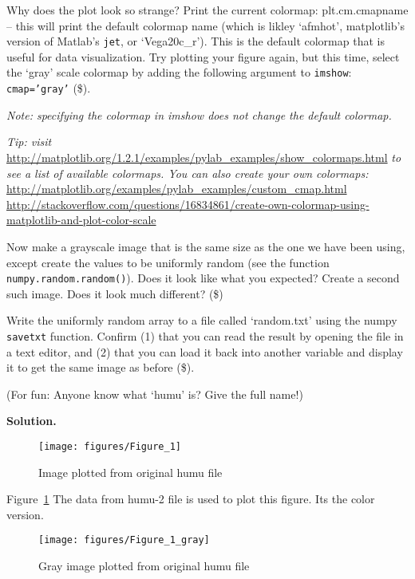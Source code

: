 \documentclass[10pt]{article}
\begin{document}
\begin{enumerate}
Why does the plot look so strange?  Print the current colormap: {plt.cm.cmapname} -- this will print the default colormap name (which is likley `afmhot', matplotlib's version of Matlab's {\tt jet}, or `Vega20c\_r').  This is the default colormap that is useful for data visualization.  Try plotting your figure again, but this time, select the `gray' scale colormap by adding the following argument to {\tt imshow}: {\tt cmap='gray'} (\$).

{\em Note: specifying the colormap in imshow does not change the default colormap.}

{\em Tip: visit} \url{http://matplotlib.org/1.2.1/examples/pylab_examples/show_colormaps.html} {\em to see a list of available colormaps.  You can also create your own colormaps:}\\
\url{http://matplotlib.org/examples/pylab_examples/custom_cmap.html}\\
\url{http://stackoverflow.com/questions/16834861/create-own-colormap-using-matplotlib-and-plot-color-scale}

Now make a grayscale image that is the same size as the one we have been using, except create the values to be uniformly random (see the function {\tt numpy.random.random()}).  Does it look like what you expected?  Create a second such image.  Does it look much different? (\$)

Write the uniformly random array to a file called `random.txt' using the numpy {\tt savetxt} function.  Confirm (1) that you can read the result by opening the file in a text editor, and (2) that you can load it back into another variable and display it to get the same image as before (\$).

(For fun: Anyone know what `humu' is?  Give the full name!)

{\bf Solution.} 
\begin{figure}[htb]
\begin{center}
\texttt{[image: figures/Figure\_1]}
\caption{Image plotted from original humu file}
\label{fig1}
\end{center}
\end{figure}

Figure~\ref{fig1} The data from humu-2 file is used to plot this figure. Its the color version.

\begin{figure}[htb]
\begin{center}
\texttt{[image: figures/Figure\_1\_gray]}
\caption{Gray image plotted from original humu file}
\label{fig2}
\end{center}
\end{figure}


\end{enumerate}
\end{document}
